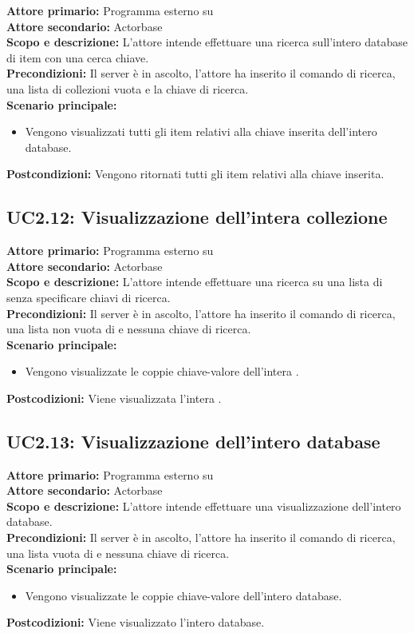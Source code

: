 \documentclass{scalatekids-article}
\begin{document}
\textbf{Attore primario:} Programma esterno su \\
\textbf{Attore secondario:} Actorbase\\
\textbf{Scopo e descrizione:}
L'attore intende effettuare una ricerca sull'intero database di item con una cerca chiave.\\
\textbf{Precondizioni:} Il server è in ascolto, l'attore ha inserito il comando di ricerca, una lista di collezioni vuota e la chiave di ricerca.\\
\textbf{Scenario principale:}
\begin{itemize}
\item Vengono visualizzati tutti gli item relativi alla chiave inserita dell'intero database.
\end{itemize}
\textbf{Postcondizioni:} Vengono ritornati tutti gli item relativi alla chiave inserita.

\subsection{UC2.12: Visualizzazione dell'intera collezione}

\textbf{Attore primario:} Programma esterno su \\
\textbf{Attore secondario:} Actorbase\\
\textbf{Scopo e descrizione:} L'attore intende effettuare una ricerca su una lista di  senza specificare chiavi di ricerca.\\
\textbf{Precondizioni:} Il server è in ascolto, l'attore ha inserito il comando di ricerca, una lista non vuota di  e nessuna chiave di ricerca.\\
\textbf{Scenario principale:}
\begin{itemize}
\item Vengono visualizzate le coppie chiave-valore dell'intera .
\end{itemize}
\textbf{Postcodizioni:} Viene visualizzata l'intera .

\subsection{UC2.13: Visualizzazione dell'intero database}

\textbf{Attore primario:} Programma esterno su \\
\textbf{Attore secondario:} Actorbase\\
\textbf{Scopo e descrizione:} L'attore intende effettuare una visualizzazione  dell'intero database.\\
\textbf{Precondizioni:} Il server è in ascolto, l'attore ha inserito il comando di ricerca, una lista vuota di  e nessuna chiave di ricerca.\\
\textbf{Scenario principale:}
\begin{itemize}
\item Vengono visualizzate le coppie chiave-valore dell'intero database.
\end{itemize}
\textbf{Postcodizioni:} Viene visualizzato l'intero database.
\end{document}
